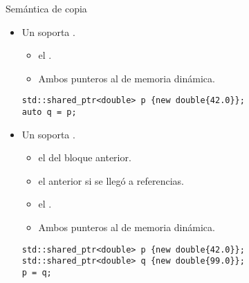 \begin{frame}[t,fragile]{Semántica de copia}
\begin{itemize}
  \item Un  soporta .
    \begin{itemize}
      \item {} el .
      \item Ambos punteros  al  de memoria dinámica.
    \end{itemize}
\begin{lstlisting}
std::shared_ptr<double> p {new double{42.0}};
auto q = p;
\end{lstlisting}

  \item Un  soporta .
    \begin{itemize}
      \item {} el  del bloque anterior.
      \item {} el  anterior 
            si se llegó a  referencias.
      \item {} el .
      \item Ambos punteros  al  de memoria dinámica.
    \end{itemize}
\begin{lstlisting}
std::shared_ptr<double> p {new double{42.0}};
std::shared_ptr<double> q {new double{99.0}};
p = q;
\end{lstlisting}

\end{itemize}
\end{frame}

